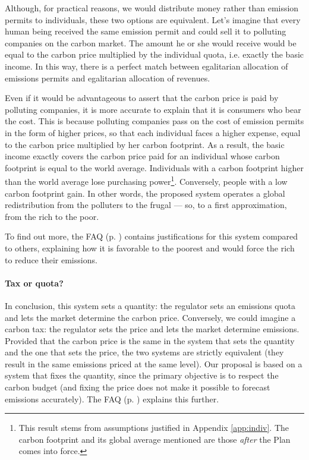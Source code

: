 \documentclass[a5paper,english,openany]{memoir}
\begin{document}
Although, for practical reasons, we would distribute money rather than emission permits to individuals, these two options are equivalent. Let's imagine that every human being received the same emission permit and could sell it to polluting companies on the carbon market. The amount he or she would receive would be equal to the carbon price multiplied by the individual quota, i.e. exactly the basic income. In this way, there is a perfect match between egalitarian allocation of emissions permits and egalitarian allocation of revenues. %

Even if it would be advantageous %
to assert that the carbon price is paid by polluting companies, it is more accurate to explain that it is consumers who bear the cost. 
This is because polluting companies pass on the cost of emission permits in the form of higher prices, so that each individual faces a higher expense, equal to the carbon price multiplied by her carbon footprint. As a result, the basic income exactly covers the carbon price paid for an individual whose carbon footprint is equal to the world average. Individuals with a carbon footprint higher than the world average lose purchasing power\footnote{This result stems from assumptions justified in Appendix \ref{app:indiv}. The carbon footprint and its global average mentioned are those \textit{after} the Plan comes into force.
}. Conversely, people with a low carbon footprint gain. In other words, the proposed system operates a global redistribution from the polluters to the frugal --- so, to a first approximation, from the rich to the poor. 

To find out more, the FAQ (p. \pageref{q:riches}) contains justifications for this system compared to others, explaining how it is favorable to the poorest and would force the rich to reduce their emissions.


\paragraph{Tax or quota?}
In conclusion, this system sets a quantity: the regulator sets an emissions quota and lets the market determine the carbon price. Conversely, we could imagine a carbon tax: the regulator sets the price and lets the market determine emissions. Provided that the carbon price is the same in the system that sets the quantity and the one that sets the price, the two systems are strictly equivalent (they result in the same emissions priced at the same level). Our proposal is based on a system that fixes the quantity, since the primary objective is to respect the carbon budget (and fixing the price does not make it possible to forecast emissions accurately). The FAQ (p. \pageref{q:taxe}) explains this further. 
\end{document}

